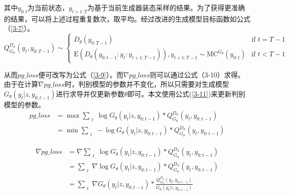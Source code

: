 其中$y_{0:t}$为当前状态，$y_{t+1:T}$为基于当前生成器装态采样的结果。为了获得更准确的结果，可以将上述过程重复数次，取平均。经过改进的生成模型目标函数如公式（\ref{3-7}）。
\begin{equation}\label{3-7}
Q_{G_\theta}^{D_\sigma}(y_t,y_{0:T-1})\sim 
\begin{cases}
    D_\theta(y_{0:T-1}) & \text{if } t =T-1 \\
    \mathrm{E}(D_\theta(y_{0:t-1}:y_t:y_{t+1:T-1})),y_{t+1:T-1}\sim \mathrm{MC}^{G_\theta}(y_{0:t}) & \text{if }t<T-1
\end{cases}
\end{equation}

从而$pg\_loss$便可改写为公式（\ref{3-9}）。而$\nabla pg\_loss$则可以通过公式（3-10）求得。由于在计算$\nabla pg\_loss$时，判别模型的参数并不变化，所以只需要对生成模型$G_\theta (y_t|z,y_{0:t-1})$进行求导并仅更新参数$\theta$即可。本文使用公式(\ref{3-11})来更新判别模型的参数。
\begin{align}\label{3-9}
    pg\_loss &=\mathop{max}\sum_{\substack{t}}\log G_\theta (y_t|z,y_{0:t-1})*Q_{G_\theta}^{D_\sigma} (y_t,y_{0:t-1})\\
             &=\mathop{min}\sum_{\substack{t}}-\log G_\theta (y_t|z,y_{0:t-1})*Q_{G_\theta}^{D_\sigma} (y_t,y_{0:t-1})
\end{align}

\begin{align}\label{3-10}
    \nabla pg\_loss &= \nabla \sum_{\substack{t}}\log G_\theta (y_t|z,y_{0:t-1})*Q_{G_\theta}^{D_\sigma} (y_t,y_{0:t-1})\\
                    &= \sum_{\substack{t}}\nabla\log G_\theta (y_t|z,y_{0:t-1})*Q_{G_\theta}^{D_\sigma} (y_t,y_{0:t-1})\\
                    &= \sum_{\substack{t}}\nabla G_\theta (y_t|z,y_{0:t-1})*\frac{Q_{G_\theta}^{D_\sigma} (y_t,y_{0:t-1})}{G_\theta (y_t|z,y_{0:t-1})}
\end{align}


